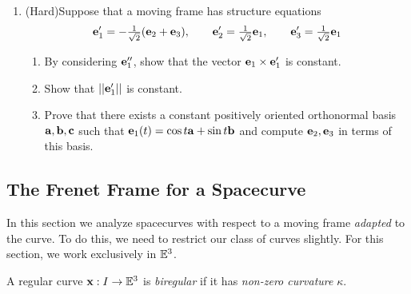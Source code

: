 \begin{exercises}
\begin{enumerate}

	\item (Hard)\quad Suppose that a moving frame has structure equations 
	\[{\mathbf{e}}'_1=-\tfrac 1{\sqrt 2}({\mathbf{e}}_2+{\mathbf{e}}_3),\qquad{\mathbf{e}}'_2=\tfrac 1{\sqrt 2}{\mathbf{e}}_1,\qquad{\mathbf{e}}'_3=\tfrac 1{\sqrt 2}{\mathbf{e}}_1\]
	\begin{enumerate}
	  \item By considering ${\mathbf{e}}_1''$, show that the vector ${\mathbf{e}}_1\times{\mathbf{e}}_1'$ is constant.
	  \item Show that $\left| \left| {\mathbf{e}}_1'\right|\right|$ is constant.
	  \item Prove that there exists a constant positively oriented orthonormal basis ${\mathbf{a}},{\mathbf{b}},{\mathbf{c}}$ such that ${\mathbf{e}}_1(t)=\cos t{\mathbf{a}}+\sin t{\mathbf{b}}$ and compute ${\mathbf{e}}_2,{\mathbf{e}}_3$ in terms of this basis.
	\end{enumerate}
% 	
% 

\end{enumerate}
\end{exercises}





\clearpage


\subsection{The Frenet Frame for a Spacecurve}\label{sec:frenet}

In this section we analyze spacecurves with respect to a moving frame \emph{adapted} to the curve. To do this, we need to restrict our class of curves slightly. For this section, we work exclusively in $\mathbb{E}^3$.


\begin{defn}{}{}
A regular curve ${\mathbf{x}}:I\to\mathbb{E}^3$ is \emph{biregular} if it has \emph{non-zero curvature} $\kappa$.
\end{defn}


